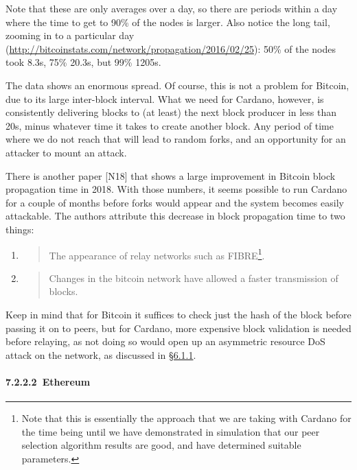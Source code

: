 \documentclass[]{article}
\let\oldparagraph\paragraph
\renewcommand{\paragraph}[1]{\oldparagraph{#1}\mbox{}}
\begin{document}
Note that these are only averages over a day, so there are periods
within a day where the time to get to 90\% of the nodes is larger. Also
notice the long tail, zooming in to a particular day
(\href{http://bitcoinstats.com/network/propagation/2016/02/25}{{http://bitcoinstats.com/network/propagation/2016/02/25}}):
50\% of the nodes took 8.3s, 75\% 20.3s, but 99\% 1205s.

The data shows an enormous spread. Of course, this is not a problem for
Bitcoin, due to its large inter-block interval. What we need for
Cardano, however, is consistently delivering blocks to (at least) the
next block producer in less than 20s, minus whatever time it takes to
create another block. Any period of time where we do not reach that will
lead to random forks, and an opportunity for an attacker to mount an
attack.

There is another paper {[}N18{]} that shows a large improvement in
Bitcoin block propagation time in 2018. With those numbers, it seems
possible to run Cardano for a couple of months before forks would appear
and the system becomes easily attackable. The authors attribute this
decrease in block propagation time to two things:

\begin{enumerate}
\def\labelenumi{\arabic{enumi}.}
\item
  \begin{quote}
  The appearance of relay networks such as FIBRE\footnote{Note that this
    is essentially the approach that we are taking with Cardano for the
    time being until we have demonstrated in simulation that our peer
    selection algorithm results are good, and have determined suitable
    parameters.}.
  \end{quote}
\item
  \begin{quote}
  Changes in the bitcoin network have allowed a faster transmission of
  blocks.
  \end{quote}
\end{enumerate}

Keep in mind that for Bitcoin it suffices to check just the hash of the
block before passing it on to peers, but for Cardano, more expensive
block validation is needed before relaying, as not doing so would open
up an asymmetric resource DoS attack on the network, as discussed in
\protect\hyperlink{interleaving-transmission-and-validation}{{§6.1.1}}.

\hypertarget{ethereum}{%
\paragraph{​7.2.2.2​~Ethereum}\label{ethereum}}
\end{document}
